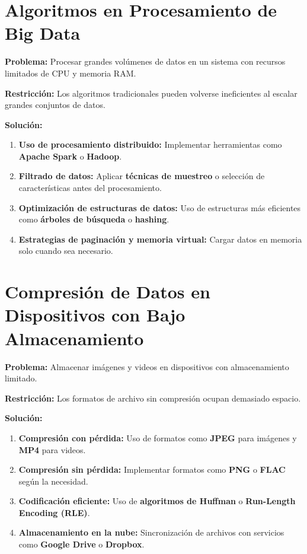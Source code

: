\documentclass{article}
\begin{document}
	\section{Algoritmos en Procesamiento de Big Data}
	
	\textbf{Problema:}  
	Procesar grandes volúmenes de datos en un sistema con recursos limitados de CPU y memoria RAM.
	
	\textbf{Restricción:}  
	Los algoritmos tradicionales pueden volverse ineficientes al escalar grandes conjuntos de datos.
	
	\textbf{Solución:}
	\begin{enumerate}
	\item \textbf{Uso de procesamiento distribuido:} Implementar herramientas como \textbf{Apache Spark} o \textbf{Hadoop}.
	\item \textbf{Filtrado de datos:} Aplicar \textbf{técnicas de muestreo} o selección de características antes del procesamiento.
	\item \textbf{Optimización de estructuras de datos:} Uso de estructuras más eficientes como \textbf{árboles de búsqueda} o \textbf{hashing}.
	\item \textbf{Estrategias de paginación y memoria virtual:} Cargar datos en memoria solo cuando sea necesario.
	\end{enumerate}
	
	\section{Compresión de Datos en Dispositivos con Bajo Almacenamiento}
	
	\textbf{Problema:}  
	Almacenar imágenes y videos en dispositivos con almacenamiento limitado.
	
	\textbf{Restricción:}  
	Los formatos de archivo sin compresión ocupan demasiado espacio.
	
	\textbf{Solución:}
	\begin{enumerate}
	\item \textbf{Compresión con pérdida:} Uso de formatos como \textbf{JPEG} para imágenes y \textbf{MP4} para videos.
	\item \textbf{Compresión sin pérdida:} Implementar formatos como \textbf{PNG} o \textbf{FLAC} según la necesidad.
	\item \textbf{Codificación eficiente:} Uso de \textbf{algoritmos de Huffman} o \textbf{Run-Length Encoding (RLE)}.
	\item \textbf{Almacenamiento en la nube:} Sincronización de archivos con servicios como \textbf{Google Drive} o \textbf{Dropbox}.
	\end{enumerate}
	
\end{document}
